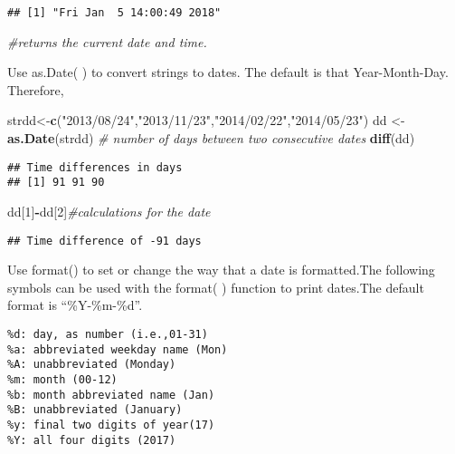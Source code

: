 \documentclass[]{book}
\newenvironment{Shaded}{\begin{snugshade}}{\end{snugshade}}
\newcommand{\KeywordTok}[1]{\textcolor[rgb]{0.13,0.29,0.53}{\textbf{#1}}}
\newcommand{\DecValTok}[1]{\textcolor[rgb]{0.00,0.00,0.81}{#1}}
\newcommand{\StringTok}[1]{\textcolor[rgb]{0.31,0.60,0.02}{#1}}
\newcommand{\CommentTok}[1]{\textcolor[rgb]{0.56,0.35,0.01}{\textit{#1}}}
\newcommand{\OperatorTok}[1]{\textcolor[rgb]{0.81,0.36,0.00}{\textbf{#1}}}
\newcommand{\NormalTok}[1]{#1}
\theoremstyle{definition}
\theoremstyle{definition}
\theoremstyle{definition}
\theoremstyle{remark}
\begin{document}
\begin{verbatim}
## [1] "Fri Jan  5 14:00:49 2018"
\end{verbatim}

\begin{Shaded}
\begin{Highlighting}[]
\CommentTok{#returns the current date and time.}
\end{Highlighting}
\end{Shaded}

Use as.Date( ) to convert strings to dates. The default is that
Year-Month-Day. Therefore,

\begin{Shaded}
\begin{Highlighting}[]
\NormalTok{strdd<-}\KeywordTok{c}\NormalTok{(}\StringTok{"2013/08/24"}\NormalTok{,}\StringTok{"2013/11/23"}\NormalTok{,}\StringTok{"2014/02/22"}\NormalTok{,}\StringTok{"2014/05/23"}\NormalTok{)}
\NormalTok{dd <-}\StringTok{ }\KeywordTok{as.Date}\NormalTok{(strdd) }
\CommentTok{# number of days between two consecutive dates}
\KeywordTok{diff}\NormalTok{(dd)}
\end{Highlighting}
\end{Shaded}

\begin{verbatim}
## Time differences in days
## [1] 91 91 90
\end{verbatim}

\begin{Shaded}
\begin{Highlighting}[]
\NormalTok{dd[}\DecValTok{1}\NormalTok{]}\OperatorTok{-}\NormalTok{dd[}\DecValTok{2}\NormalTok{]}\CommentTok{#calculations for the date}
\end{Highlighting}
\end{Shaded}

\begin{verbatim}
## Time difference of -91 days
\end{verbatim}

Use format() to set or change the way that a date is formatted.The
following symbols can be used with the format( ) function to print
dates.The default format is ``\%Y-\%m-\%d''.

\begin{verbatim}
%d: day, as number (i.e.,01-31)
%a: abbreviated weekday name (Mon) 
%A: unabbreviated (Monday)
%m: month (00-12)
%b: month abbreviated name (Jan)
%B: unabbreviated (January)
%y: final two digits of year(17)
%Y: all four digits (2017)
\end{verbatim}
\end{document}
